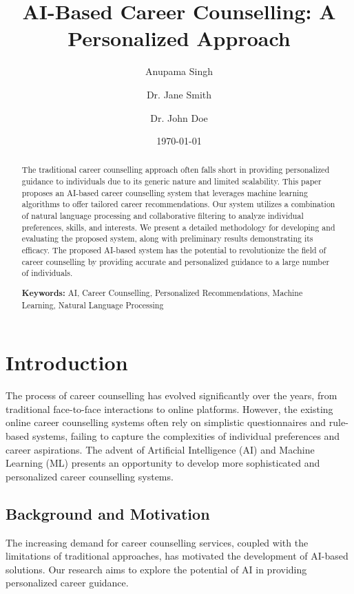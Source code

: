 \documentclass[12pt,a4paper]{article}
\title{AI-Based Career Counselling: A Personalized Approach}
\author{Anupama Singh \and Dr. Jane Smith \and Dr. John Doe}
\date{\today}
\begin{document}
\maketitle
\thispagestyle{empty}

\begin{abstract}
The traditional career counselling approach often falls short in providing personalized guidance to individuals due to its generic nature and limited scalability. This paper proposes an AI-based career counselling system that leverages machine learning algorithms to offer tailored career recommendations. Our system utilizes a combination of natural language processing and collaborative filtering to analyze individual preferences, skills, and interests. We present a detailed methodology for developing and evaluating the proposed system, along with preliminary results demonstrating its efficacy. The proposed AI-based system has the potential to revolutionize the field of career counselling by providing accurate and personalized guidance to a large number of individuals.

\textbf{Keywords:} AI, Career Counselling, Personalized Recommendations, Machine Learning, Natural Language Processing
\end{abstract}

\newpage
\tableofcontents
\newpage

\twocolumn
\section{Introduction}
The process of career counselling has evolved significantly over the years, from traditional face-to-face interactions to online platforms. However, the existing online career counselling systems often rely on simplistic questionnaires and rule-based systems, failing to capture the complexities of individual preferences and career aspirations. The advent of Artificial Intelligence (AI) and Machine Learning (ML) presents an opportunity to develop more sophisticated and personalized career counselling systems.

\subsection{Background and Motivation}
The increasing demand for career counselling services, coupled with the limitations of traditional approaches, has motivated the development of AI-based solutions. Our research aims to explore the potential of AI in providing personalized career guidance.
\end{document}
